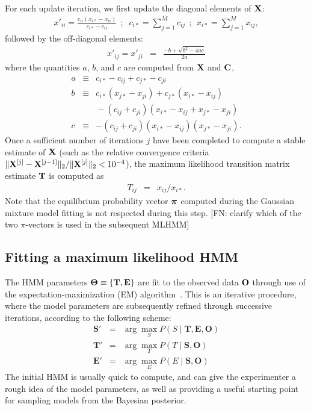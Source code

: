 \documentclass[aps,pre,twocolumn,superscriptaddress,nofootinbib,longbibliography]{revtex4-1}
\newcommand{\bfv}[1]{{\mbox{\boldmath{$#1$}}}}
\newcommand{\bfm}[1]{{\bf #1}}
\begin{document}
{For each update iteration, we first update the diagonal elements of $\bfm{X}$:
\begin{eqnarray}
x'_{ii} = \frac{c_{ii} (x_{i*} - x_{ii})}{c_{i*} - c_{ii}}  \:\:;\;\; c_{i*} = \sum_{j=1}^M c_{ij} \:\:;\:\: x_{i*} = \sum_{j=1}^M x_{ij} ,
\end{eqnarray}
followed by the off-diagonal elements:
\begin{eqnarray}
x'_{ij} = x'_{ji} &=& \frac{-b + \sqrt{b^2 - 4 a c}}{2 a}
\end{eqnarray}
where the quantities $a$, $b$, and $c$ are computed from $\bfm{X}$ and $\bfm{C}$,
\begin{eqnarray}
a &\equiv& c_{i*} - c_{ij} + c_{j*} - c_{ji} \nonumber \\
b &\equiv& c_{i*} (x_{j*} - x_{ji}) + c_{j*} (x_{i*} - x_{ij}) \nonumber \\
&&\mbox{}- (c_{ij} + c_{ji}) (x_{i*} - x_{ij} + x_{j*} - x_{ji}) \nonumber \\
c &\equiv& - (c_{ij} + c_{ji}) (x_{i*} - x_{ij}) (x_{j*} - x_{ji}) .
\end{eqnarray}
Once a sufficient number of iterations $j$ have been completed to compute a stable estimate of $\bfm{X}$ (such as the relative convergence criteria $\|\bfm{X}^{[j]} - \bfm{X}^{[j-1]}\|_2 / \|\bfm{X}^{[j]}\|_2 < 10^{-4}$), the maximum likelihood transition matrix estimate $\bfm{T}$ is computed as
\begin{eqnarray}
T_{ij} &=& x_{ij} / x_{i*} . 
\end{eqnarray}
Note that the equilibrium probability vector $\bfv{\pi}$ computed during the Gaussian mixture model fitting is not respected during this step.
{\color{magenta}[FN: clarify which of the two $\pi$-vectors is used in the subsequent MLHMM]}

\subsection{Fitting a maximum likelihood HMM}
\label{section:fitting-mlhmm}

The HMM parameters $\bfm{\Theta} \equiv \{ \bfm{T}, \bfm{E} \}$ are fit to the observed data $\bfm{O}$ through use of the expectation-maximization (EM) algorithm~\cite{dempster-laird-rubin:1977:j-royal-statist-soc-b:em-algorithm}.
This is an iterative procedure, where the model parameters are subsequently refined through successive iterations, according to the following
scheme:
\color{magenta}
\begin{eqnarray}
\mathbf{S'} &=& \arg \max_S P(S \mid \mathbf{T}, \mathbf{E}, \mathbf{O})\\
\mathbf{T'} &=& \arg \max_T P(T \mid \mathbf{S}, \mathbf{O})\\
\mathbf{E'} &=& \arg \max_E P(E \mid \mathbf{S}, \mathbf{O})
\end{eqnarray}
\color{black}
The initial HMM is usually quick to compute, and can give the experimenter a rough idea of the model parameters, as well as providing a useful starting point for sampling models from the Bayesian posterior.

}
\end{document}
